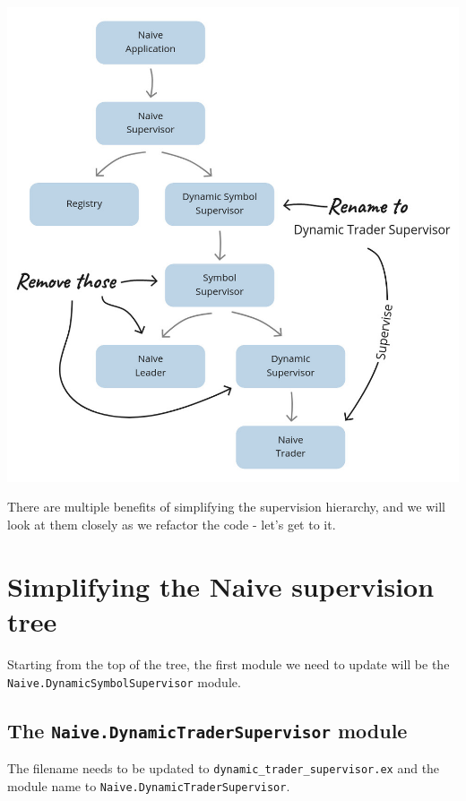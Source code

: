 \documentclass[
  oneside]{book}
\begin{document}
\begin{center}\includegraphics[width=1\linewidth]{images/chapter_20_01_current_hierarchy} \end{center}

There are multiple benefits of simplifying the supervision hierarchy, and we will look at them closely as we refactor the code - let's get to it.

\section{Simplifying the Naive supervision tree}\label{simplifying-the-naive-supervision-tree}

Starting from the top of the tree, the first module we need to update will be the \texttt{Naive.DynamicSymbolSupervisor} module.

\subsection{\texorpdfstring{The \texttt{Naive.DynamicTraderSupervisor} module}{The Naive.DynamicTraderSupervisor module}}\label{the-naive.dynamictradersupervisor-module}

The filename needs to be updated to \texttt{dynamic\_trader\_supervisor.ex} and the module name to \texttt{Naive.DynamicTraderSupervisor}.
\end{document}
